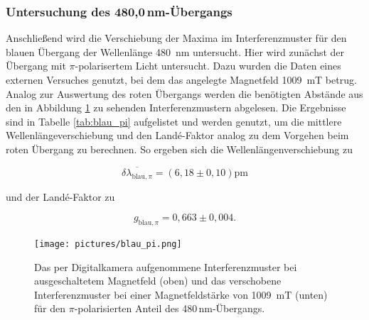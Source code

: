         \subsubsection*{Untersuchung des 480,0\,nm-Übergangs}
            Anschließend wird die Verschiebung der Maxima im Interferenzmuster für den blauen Übergang der Wellenlänge \SI{480}{\nano\metre} untersucht. Hier wird zunächst der Übergang mit $\pi$-polarisertem
            Licht untersucht. Dazu wurden die Daten eines externen Versuches genutzt, bei dem das angelegte Magnetfeld \SI{1009}{\milli\tesla} betrug.
            Analog zur Auswertung des roten Übergangs 
            werden die benötigten Abstände aus den in Abbildung \ref{fig:blau_pi} zu sehenden Interferenzmustern abgelesen. Die Ergebnisse sind in 
            Tabelle \ref{tab:blau_pi} aufgelistet und werden genutzt, um die mittlere Wellenlängeverschiebung und den Landé-Faktor analog zu dem Vorgehen beim roten Übergang zu berechnen. So ergeben sich die
            Wellenlängenverschiebung zu

            \begin{equation*}
                \overline{\delta \lambda_{\text{blau}, \pi}} = \left(6,18 \pm 0,10\right)\si{\pico\metre}
            \end{equation*}

            und der Landé-Faktor zu

            \begin{equation*}
              g_{\text{blau}, \pi} = 0,663 \pm 0,004 .
            \end{equation*}

            \FloatBarrier

            \begin{figure}[h]
              \centering
              \texttt{[image: pictures/blau\_pi.png]}
              \caption{Das per Digitalkamera aufgenommene Interferenzmuster bei ausgeschaltetem Magnetfeld (oben) und das verschobene Interferenzmuster bei einer Magnetfeldstärke von \SI{1009}{\milli\tesla} (unten) für den $\pi$-polarisierten Anteil des 480\,nm-Übergangs.}
              \label{fig:blau_pi}
            \end{figure}
        
            \FloatBarrier

